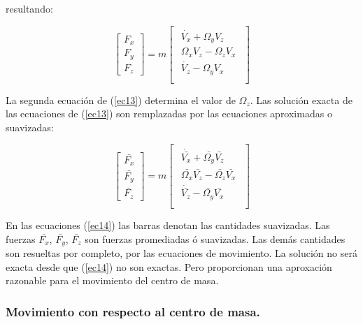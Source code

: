 	resultando:

		\begin{equation}
		\begin{bmatrix}
  		F_{x}\\
  		F_{y}\\
  		F_{z}
	  	\end{bmatrix} =
  		m \begin{bmatrix}
  		\begin{matrix}
  		\dot{V_{x}} + \Omega_{y}V_{z}\\
	    \Omega_{x}V_{z}-\Omega_{z}V_{x} \\
  		\dot{V_{z}}-\Omega_{y}V_{x}\\
   		\end{matrix}
  		\end{bmatrix}
		\label{ec13}
		\end{equation} %

	La segunda ecuación de (\ref{ec13}) determina el valor de $\Omega_{z}$. Las solución exacta de las ecuaciones de (\ref{ec13}) son remplazadas por las ecuaciones  aproximadas o suavizadas:

		\begin{equation}
		\begin{bmatrix}
  		\bar{F_{x}}\\
  		\bar{F_{y}}\\
  		\bar{F_{z}}
  		\end{bmatrix} =
  		m \begin{bmatrix}
  		\begin{matrix}
  		\dot{\bar{V_{x}}} + \bar{\Omega_{y}}\bar{V_{z}}\\
    	\bar{\Omega_{x}}\bar{V_{z}}-\bar{\Omega_{z}}\bar{V_{x}} \\
  		\dot{\bar{V_{z}}}-\bar{\Omega_{y}}\bar{V_{x}}\\
   		\end{matrix}
  		\end{bmatrix}
		\label{ec14}
		\end{equation} %

	En las ecuaciones (\ref{ec14}) las barras denotan las cantidades suavizadas. Las fuerzas $\bar{F_{x}}$, $\bar{F_{y}}$, $\bar{F_{z}}$ son fuerzas promediadas ó suavizadas. Las demás cantidades son resueltas por completo, por las ecuaciones de movimiento. La solución no será exacta desde que (\ref{ec14}) no son exactas. Pero proporcionan una aproxación razonable para el movimiento del centro de masa.

		\subsubsection{Movimiento con respecto al centro de masa.}


